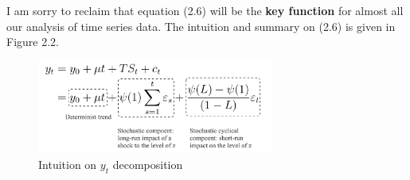 \documentclass[12pt]{article}
\theoremstyle{definition}
\numberwithin{equation}{section}
\numberwithin{figure}{section}
\numberwithin{table}{section}
\begin{document}
I am sorry to reclaim that equation (2.6) will be the \textbf{key function} for almost all our analysis of time series data. The intuition and summary on (2.6) is given in Figure 2.2.
\begin{figure}[H]
  \centering
  \includegraphics[width=0.69\textwidth]{ydecom}
  \caption{Intuition on $y_t$ decomposition}
\end{figure}










\newpage


\end{document}
